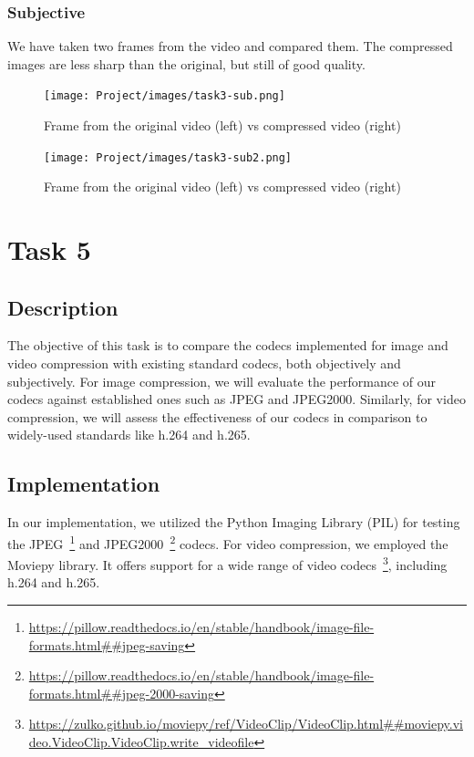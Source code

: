 \documentclass{article}
\begin{document}
\subsubsection{Subjective}

We have taken two frames from the video and compared them. The compressed images are less sharp than the original, but still of good quality.

\begin{figure}[H]
  \centering
  \texttt{[image: Project/images/task3-sub.png]}
  \caption{Frame from the original video (left) vs compressed video (right)}
  \label{fig:task3-sub}
\end{figure}

\begin{figure}[H]
  \centering
  \texttt{[image: Project/images/task3-sub2.png]}
  \caption{Frame from the original video (left) vs compressed video (right)}
  \label{fig:task3-sub2}
\end{figure}

\section{Task 5}
\subsection{Description}

The objective of this task is to compare the codecs implemented for image and video compression with existing standard codecs, both objectively and subjectively. For image compression, we will evaluate the performance of our codecs against established ones such as JPEG and JPEG2000. Similarly, for video compression, we will assess the effectiveness of our codecs in comparison to widely-used standards like h.264 and h.265. 

\subsection{Implementation} 

In our implementation, we utilized the Python Imaging Library (PIL) for testing the JPEG~\footnote{\url{https://pillow.readthedocs.io/en/stable/handbook/image-file-formats.html##jpeg-saving}} and JPEG2000~\footnote{\url{https://pillow.readthedocs.io/en/stable/handbook/image-file-formats.html##jpeg-2000-saving}} codecs. For video compression, we employed the Moviepy library. It offers support for a wide range of video codecs~\footnote{\url{https://zulko.github.io/moviepy/ref/VideoClip/VideoClip.html##moviepy.video.VideoClip.VideoClip.write_videofile}}, including h.264 and h.265.
\end{document}
